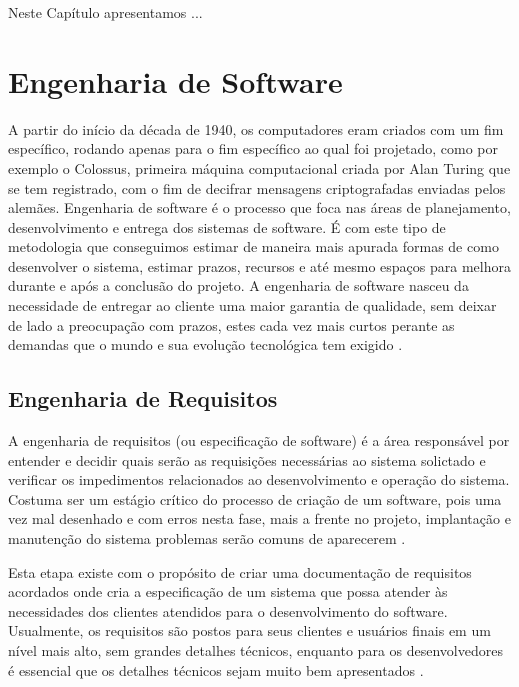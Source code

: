 \label{referencial}

Neste Capítulo apresentamos ...

\section{Engenharia de Software}
 A partir do início da década de 1940, os computadores eram criados com um fim específico, rodando apenas para o fim específico ao qual foi projetado, como por exemplo o Colossus, primeira máquina computacional criada  por Alan Turing que se tem registrado, com o fim de decifrar mensagens criptografadas enviadas pelos alemães\cite{colossus}.
 Engenharia de software é o processo que foca nas áreas de planejamento, desenvolvimento e entrega dos sistemas de software. É com este tipo de metodologia que conseguimos estimar de maneira mais apurada formas de como desenvolver o sistema, estimar prazos, recursos e até mesmo espaços para melhora durante e após a conclusão do projeto. A engenharia de software nasceu da necessidade de entregar ao cliente uma maior garantia de qualidade, sem deixar de lado a preocupação com prazos, estes cada vez mais curtos perante as demandas que o mundo e sua evolução tecnológica tem exigido \cite{Sommerville07}. 

\subsection{Engenharia de Requisitos}
A engenharia de requisitos (ou especificação de software) é a área responsável por entender e decidir quais serão as requisições necessárias ao sistema solictado e verificar os impedimentos relacionados ao desenvolvimento e operação do sistema. Costuma ser um estágio crítico do processo de criação de um software, pois uma vez mal desenhado e com erros nesta fase, mais a frente no projeto, implantação e manutenção do sistema problemas serão comuns de aparecerem \cite{Sommerville07}.

Esta etapa existe com o propósito de criar uma documentação de requisitos acordados onde cria a especificação de um sistema que possa atender às necessidades dos clientes atendidos para o desenvolvimento do software. Usualmente, os requisitos são postos para seus clientes e usuários finais em um nível mais alto, sem grandes detalhes técnicos, enquanto para os desenvolvedores é essencial que os detalhes técnicos sejam muito bem apresentados \cite{Sommerville07}.

